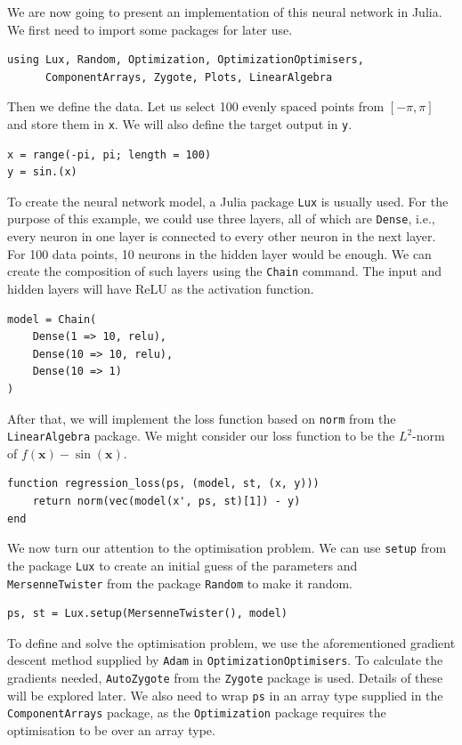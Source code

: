 \documentclass[a4paper,11pt, titlepage]{article}
\theoremstyle{definition}
\theoremstyle{plain}
\theoremstyle{remark}
\begin{document}
We are now going to present an implementation of this neural network in Julia. We first need to import some packages for later use. 

\begin{verbatim}
using Lux, Random, Optimization, OptimizationOptimisers,
      ComponentArrays, Zygote, Plots, LinearAlgebra
\end{verbatim}

Then we define the data. Let us select 100 evenly spaced points from $[-\pi, \pi]$ and store them in \verb|x|. We will also define the target output in \verb|y|.

\begin{verbatim}
x = range(-pi, pi; length = 100)
y = sin.(x)
\end{verbatim}

To create the neural network model, a Julia package \verb|Lux| is usually used. For the purpose of this example, we could use three layers, all of which are \verb|Dense|, i.e., every neuron in one layer is connected to every other neuron in the next layer. For 100 data points, 10 neurons in the hidden layer would be enough. We can create the composition of such layers using the \verb|Chain| command. The input and hidden layers will have ReLU as the activation function.

\begin{verbatim}
model = Chain(
    Dense(1 => 10, relu),
    Dense(10 => 10, relu),
    Dense(10 => 1)
)
\end{verbatim}

After that, we will implement the loss function based on \verb|norm| from the \verb|LinearAlgebra| package. We might consider our loss function to be the $L^2$-norm of $f(\mathbf{x}) - \sin (\mathbf{x})$.

\begin{verbatim}
function regression_loss(ps, (model, st, (x, y)))
    return norm(vec(model(x', ps, st)[1]) - y)
end
\end{verbatim}

We now turn our attention to the optimisation problem. We can use \verb|setup| from the package \verb|Lux| to create an initial guess of the parameters and \verb|MersenneTwister| from the package \verb|Random| to make it random.

\begin{verbatim}
ps, st = Lux.setup(MersenneTwister(), model)
\end{verbatim}

To define and solve the optimisation problem, we use the aforementioned gradient descent method supplied by \verb|Adam| in \verb|OptimizationOptimisers|. To calculate the gradients needed, \verb|AutoZygote| from the \verb|Zygote| package is used. Details of these will be explored later. We also need to wrap \verb|ps| in an array type supplied in the \verb|ComponentArrays| package, as the \verb|Optimization| package requires the optimisation to be over an array type.
\end{document}
